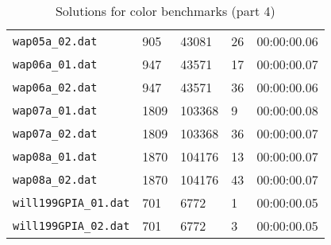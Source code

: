 \documentclass{article}
\begin{document}
\begin{table}
\begin{tabular}{y{3.6cm}x{1cm}x{1.5cm}x{1.5cm}y{1.5cm}}
    \verb|wap05a_02.dat| & 905 & 43081 & 26 & 00:00:00.06 \\
    \verb|wap06a_01.dat| & 947 & 43571 & 17 & 00:00:00.07 \\
    \verb|wap06a_02.dat| & 947 & 43571 & 36 & 00:00:00.06 \\
    \verb|wap07a_01.dat| & 1809 & 103368 & 9 & 00:00:00.08 \\
    \verb|wap07a_02.dat| & 1809 & 103368 & 36 & 00:00:00.07 \\
    \verb|wap08a_01.dat| & 1870 & 104176 & 13 & 00:00:00.07 \\
    \verb|wap08a_02.dat| & 1870 & 104176 & 43 & 00:00:00.07 \\
    \verb|will199GPIA_01.dat| & 701 & 6772 & 1 & 00:00:00.05 \\
    \verb|will199GPIA_02.dat| & 701 & 6772 & 3 & 00:00:00.05 \\
  \end{tabular}
  \caption{Solutions for color benchmarks (part 4)}
\end{table}
\end{document}
